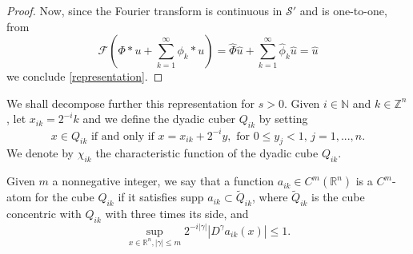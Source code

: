 \documentclass[leqno,twoside, 12pt]{amsart}
\theoremstyle{plain}
\numberwithin{equation}{section} \numberwithin{figure}{section}
\theoremstyle{definition}
\newcommand{\R}{\mathbb R}
\numberwithin{equation}{section}
\begin{document}
\begin{proof}
Now, since the Fourier transform is continuous in $\mathcal{S}'$ and is one-to-one, from
$$\mathcal{F}\left(\Phi*u + \sum_{k=1}^\infty \phi_k*u\right) = \hat\Phi\hat u + \sum_{k=1}^{\infty}\hat \phi_k \hat u= \hat u$$we conclude \eqref{representation}.
\end{proof}

We shall decompose further this representation for $s>0$. Given $i\in \mathbb{N}$ and $k\in \mathbb{Z}^n$, let $x_{ik}=2^{-i}k$ and we define the dyadic cuber $Q_{ik}$ by setting
$$x\in Q_{ik} \text{ if and only if }x=x_{ik}+2^{-i}y, \text{ for }0\leq y_j<1,\,j=1, ..., n.$$We denote by $\chi_{ik}$ the characteristic function of the dyadic cube $Q_{ik}$. 

Given $m$ a nonnegative integer, we say that a function $a_{ik}\in C^m(\R^n)$ is a $C^m$-atom for the cube $Q_{ik}$ if it satisfies supp $a_{ik} \subset \tilde{Q}_{ik}$, where $\tilde{Q}_{ik}$ is the cube concentric with $Q_{ik}$ with three times its side, and 
\begin{equation}
\sup_{x\in \R^n, |\gamma|\leq m}2^{-i|\gamma|}|D^{\gamma}a_{ik}(x)|\leq 1.
\end{equation}
\end{document}
